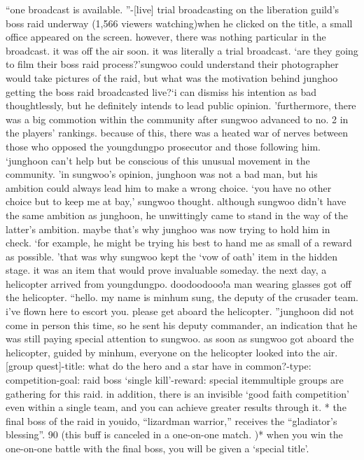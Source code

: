 “one broadcast is available.
”-[live] trial broadcasting on the liberation guild’s boss raid underway (1,566 viewers watching)when he clicked on the title, a small office appeared on the screen.
 however, there was nothing particular in the broadcast.
 it was off the air soon.
 it was literally a trial broadcast.
‘are they going to film their boss raid process?’sungwoo could understand their photographer would take pictures of the raid, but what was the motivation behind junghoo getting the boss raid broadcasted live?‘i can dismiss his intention as bad thoughtlessly, but he definitely intends to lead public opinion.
’furthermore, there was a big commotion within the community after sungwoo advanced to no.
 2 in the players’ rankings.
 because of this, there was a heated war of nerves between those who opposed the youngdungpo prosecutor and those following him.
‘junghoon can’t help but be conscious of this unusual movement in the community.
’in sungwoo’s opinion, junghoon was not a bad man, but his ambition could always lead him to make a wrong choice.
‘you have no other choice but to keep me at bay,’ sungwoo thought.
although sungwoo didn’t have the same ambition as junghoon, he unwittingly came to stand in the way of the latter’s ambition.
 maybe that’s why junghoo was now trying to hold him in check.
‘for example, he might be trying his best to hand me as small of a reward as possible.
’that was why sungwoo kept the ‘vow of oath’ item in the hidden stage.
 it was an item that would prove invaluable someday.
the next day, a helicopter arrived from youngdungpo.
doodoodooo!a man wearing glasses got off the helicopter.
“hello.
 my name is minhum sung, the deputy of the crusader team.
 i’ve flown here to escort you.
 please get aboard the helicopter.
”junghoon did not come in person this time, so he sent his deputy commander, an indication that he was still paying special attention to sungwoo.
as soon as sungwoo got aboard the helicopter, guided by minhum, everyone on the helicopter looked into the air.
[group quest]-title: what do the hero and a star have in common?-type: competition-goal: raid boss ‘single kill’-reward: special itemmultiple groups are gathering for this raid.
 in addition, there is an invisible ‘good faith competition’ even within a single team, and you can achieve greater results through it.
* the final boss of the raid in youido, “lizardman warrior,” receives the “gladiator’s blessing”.
 90%
 (this buff is canceled in a one-on-one match.
)* when you win the one-on-one battle with the final boss, you will be given a ‘special title’.


 